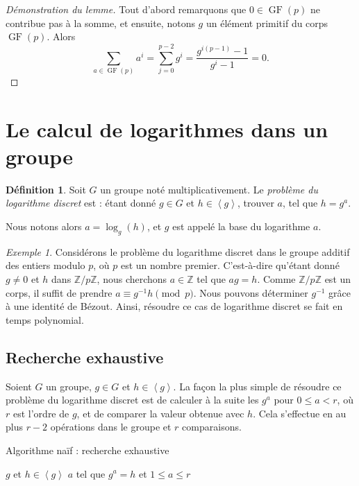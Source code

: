 \documentclass[a4paper, titlepage]{article}
\theoremstyle{definition}
\newtheorem{defi}[theo]{Définition}
\theoremstyle{remark}
\newtheorem{exem}[theo]{Exemple}
\def\Z{\mathbb Z}
\def\gf{\operatorname{GF}}
\def\gen #1{\left\langle#1\right\rangle}
\begin{document}
\begin{proof}[Démonstration du lemme]
Tout d'abord remarquons que $0 \in \gf(p)$ ne contribue pas à la somme, et ensuite, notons $g$ un élément primitif du corps $\gf(p)$. Alors
$$\sum_{a\in\gf(p)} a^i = \sum_{j=0}^{p-2} g^i = \frac{g^{i(p-1)} - 1}{g^{i} - 1} = 0.$$
\end{proof}

\section{Le calcul de logarithmes dans un groupe}\label{logDiscret}

\begin{defi}
Soit $G$ un groupe noté multiplicativement. Le \textit{problème du logarithme discret} est : étant donné $g\in G$ et $h \in \gen{g}$, trouver $a$, tel que $h=g^a$.\end{defi}
Nous notons alors $a=\log_g(h)$, et $g$ est appelé la base du logarithme $a$.


\begin{exem}
Considérons le problème du logarithme discret dans le groupe additif des entiers modulo $p$, où $p$ est un nombre premier. C'est-à-dire qu'étant donné $g \neq 0$ et $h$ dans $\Z/p\Z$, nous cherchons $a \in \Z$ tel que $ag = h$. Comme $\Z/p\Z$ est un corps, il suffit de prendre $a \equiv g^{-1}h \pmod{p}$. Nous pouvons déterminer $g^{-1}$ grâce à une identité de Bézout. Ainsi, résoudre ce cas de logarithme discret se fait en temps polynomial.
\end{exem}

\subsection{Recherche exhaustive}

Soient $G$ un groupe, $g\in G$ et $h \in \gen{g}$. La façon la plus simple de résoudre ce problème du logarithme discret est de calculer à la suite les $g^a$ pour $0 \leqslant a < r$, où $r$ est l'ordre de $g$, et de comparer la valeur obtenue avec $h$. Cela s'effectue en au plus $r - 2$ opérations dans le groupe et $r$ comparaisons.

\begin{algorithm}[H]
\caption{Algorithme naïf : recherche exhaustive}
\label{algoLogDiscretNaif}
\begin{algorithmic}[1]
\REQUIRE $g$ et $h \in \gen{g}$
\ENSURE $a$ tel que $g^a = h$ et $1 \leqslant a \leqslant r$
\ENDWHILE
{}
\end{algorithmic}
\end{algorithm}
\end{document}
